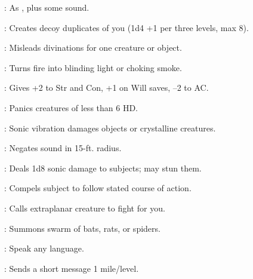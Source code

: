 \begin{multicols}{2}
\begin{description*}
\item[\linkspell{Minor Image}:] As , plus some sound.
\item[\linkspell{Mirror Image}:] Creates decoy duplicates of you (1d4 +1 per three levels, max 8).
\item[\linkspell{Misdirection}:] Misleads divinations for one creature or object.
\item[\linkspell{Pyrotechnics}:] Turns fire into blinding light or choking smoke.
\item[\linkspell{Rage}:] Gives +2 to Str and Con, +1 on Will saves, –2 to AC.
\item[\linkspell{Scare}:] Panics creatures of less than 6 HD.
\item[\linkspell{Shatter}:] Sonic vibration damages objects or crystalline creatures.
\item[\linkspell{Silence}:] Negates sound in 15-ft. radius.
\item[\linkspell{Sound Burst}:] Deals 1d8 sonic damage to subjects; may stun them.
\item[\linkspell{Suggestion}:] Compels subject to follow stated course of action.
\item[\linkspell{Summon Monster II}:] Calls extraplanar creature to fight for you.
\item[\linkspell{Summon Swarm}:] Summons swarm of bats, rats, or spiders.
\item[\linkspell{Tongues}:] Speak any language.
\item[\linkspell{Whispering Wind}:] Sends a short message 1 mile/level.
\end{description*}


\end{multicols}
